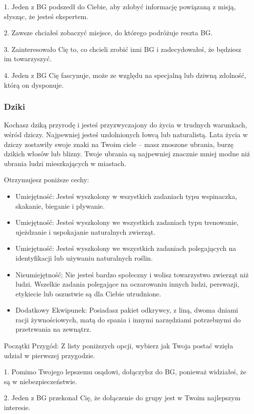 1. Jeden z BG podszedł do Ciebie, aby zdobyć informację powiązaną z misją, słysząc, że jesteś ekspertem.

2. Zawsze chciałeś zobaczyć miejsce, do którego podróżuje reszta BG.

3. Zainteresowało Cię to, co chcieli zrobić inni BG i zadecydowałeś, że będziesz im towarzyszyć.

4. Jeden z BG Cię fascynuje, może ze względu na specjalną lub dziwną zdolność, którą on dysponuje.


\subsubsection{Dziki}

Kochasz dziką przyrodę i jesteś przyzwyczajony do życia w trudnych warunkach, wśród dziczy. Najpewniej jesteś uzdolnionych łowcą lub naturalistą. Lata życia w dziczy zostawiły swoje znaki na Twoim ciele – masz znoszone ubrania, burzę dzikich włosów lub blizny. Twoje ubrania są najpewniej znacznie mniej modne niż ubrania ludzi mieszkających w miastach. 

Otrzymujesz poniższe cechy:
\begin{itemize}
 \item Umiejętność: Jesteś wyszkolony w wszystkich zadaniach typu wspinaczka, skakanie, bieganie i pływanie.
\item Umiejętność: Jesteś wyszkolony we wszystkich zadaniach typu trenowanie, ujeżdzanie i uspokajanie naturalnych zwierząt.
\item Umiejętność: Jesteś wyszkolony we wszystkich zadaniach polegających na identyfikacji lub używaniu naturalnych roślin.
\item Nieumiejętność; Nie jesteś bardzo społeczny i wolisz towarzystwo zwierząt niż ludzi. Wszelkie zadania polegające na oczarowaniu innych ludzi, perswazji, etykiecie lub oszustwie są dla Ciebie utrudnione.
\item Dodatkowy Ekwipunek: Posiadasz pakiet odkrywcy, z liną, dwoma dniami racji żywnościowych, matą do spania i innymi narzędziami potrzebnymi do przetrwania na zewnątrz.
\end{itemize}    
    
Początki Przygód: Z listy poniższych opcji, wybierz jak Twoja postać wzięła udział w pierwszej przygodzie.

1. Pomimo Twojego lepszemu osądowi, dołączyłsz do BG, ponieważ widziałeś, że są w niebezpieczeństwie.

2. Jeden z BG przekonał Cię, że dołączenie do grupy jest w Twoim najlepszym interesie.

